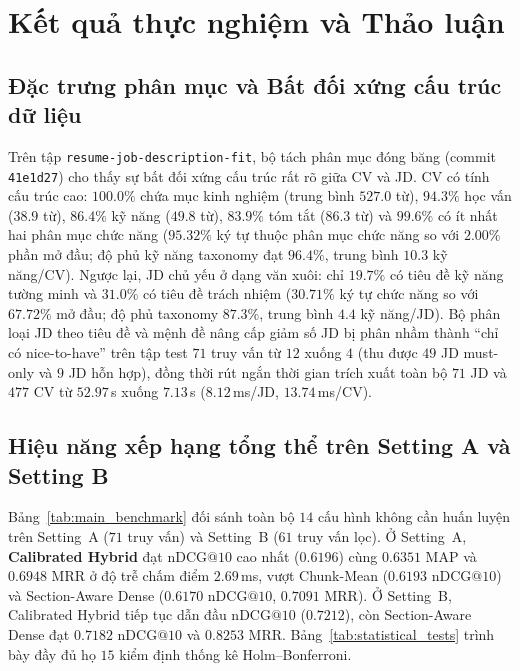 \section{Kết quả thực nghiệm và Thảo luận}

\subsection{Đặc trưng phân mục và Bất đối xứng cấu trúc dữ liệu}
Trên tập \texttt{resume-job-\allowbreak description-fit}, bộ tách phân mục đóng băng (commit \texttt{41e1d27}) cho thấy sự bất đối xứng cấu trúc rất rõ giữa CV và JD. CV có tính cấu trúc cao: $100.0\%$ chứa mục kinh nghiệm (trung bình $527.0$ từ), $94.3\%$ học vấn ($38.9$ từ), $86.4\%$ kỹ năng ($49.8$ từ), $83.9\%$ tóm tắt ($86.3$ từ) và $99.6\%$ có ít nhất hai phân mục chức năng ($95.32\%$ ký tự thuộc phân mục chức năng so với $2.00\%$ phần mở đầu; độ phủ kỹ năng taxonomy đạt $96.4\%$, trung bình $10.3$ kỹ năng/CV). Ngược lại, JD chủ yếu ở dạng văn xuôi: chỉ $19.7\%$ có tiêu đề kỹ năng tường minh và $31.0\%$ có tiêu đề trách nhiệm ($30.71\%$ ký tự chức năng so với $67.72\%$ mở đầu; độ phủ taxonomy $87.3\%$, trung bình $4.4$ kỹ năng/JD). Bộ phân loại JD theo tiêu đề và mệnh đề nâng cấp giảm số JD bị phân nhầm thành ``chỉ có nice-to-have'' trên tập test $71$ truy vấn từ $12$ xuống $4$ (thu được $49$ JD must-only và $9$ JD hỗn hợp), đồng thời rút ngắn thời gian trích xuất toàn bộ $71$ JD và $477$ CV từ $52.97$\,s xuống $7.13$\,s ($8.12$\,ms/JD, $13.74$\,ms/CV).

\subsection{Hiệu năng xếp hạng tổng thể trên Setting A và Setting B}
Bảng~\ref{tab:main_benchmark} đối sánh toàn bộ $14$ cấu hình không cần huấn luyện trên Setting~A ($71$ truy vấn) và Setting~B ($61$ truy vấn lọc). Ở Setting~A, \textbf{Calibrated Hybrid} đạt $\text{nDCG}@10$ cao nhất ($\mathbf{0.6196}$) cùng $0.6351$ $\text{MAP}$ và $0.6948$ $\text{MRR}$ ở độ trễ chấm điểm $2.69$\,ms, vượt Chunk-Mean ($0.6193$ $\text{nDCG}@10$) và Section-Aware Dense ($0.6170$ $\text{nDCG}@10$, $0.7091$ $\text{MRR}$). Ở Setting~B, Calibrated Hybrid tiếp tục dẫn đầu $\text{nDCG}@10$ ($\mathbf{0.7212}$), còn Section-Aware Dense đạt $0.7182$ $\text{nDCG}@10$ và $0.8253$ $\text{MRR}$. Bảng~\ref{tab:statistical_tests} trình bày đầy đủ họ $15$ kiểm định thống kê Holm--Bonferroni.




